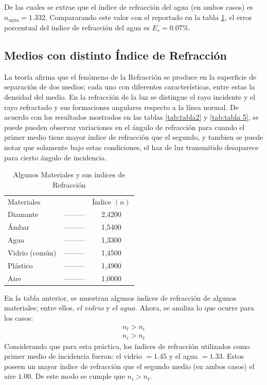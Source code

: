 \documentclass[
aps,
reprint,
amsmath, amssymb,
superscriptaddress,
]{revtex4-2}
\begin{document}
De las cuales se extrae que el índice de refracción del agua (en ambos casos) es $n_{\text{agua}}= 1.332$. Compararando este valor con el reportado en la tabla \ref{tab:indices}, el error porcentual del índice de refracción del agua es $E_r=0.07\%$.

\subsection{Medios con distinto Índice de Refracción}

La teoría afirma que el fenómeno de la Refracción se produce en la superficie de separación de dos medios; cada uno con diferentes características, entre estas la densidad del medio. En la refracción de la luz se distingue el rayo incidente y el rayo refractado y sus formaciones angulares respecto a la línea normal. De acuerdo con los resultados mostrados en las tablas \ref{tab:tabla2} y \ref{tab:tabla 5}, se puede pueden observar variaciones en el ángulo de refracción para cuando el primer medio tiene mayor índice de refracción que el segundo, y tambien se puede notar que solamente bajo estas condiciones, el haz de luz transmitido desaparece para cierto ángulo de incidencia.

\begin{table}[H]
	\caption{\label{tab:indices} Algunos Materiales y sus índices de Refracción}
	\begin{ruledtabular}
		\begin{tabular}{lcc}
            \textrm{Materiales} & \textrm{} & \textrm{Índice $(n)$}\\
			\colrule
			Diamante            & --------- & 2,4200\\
            Ámbar               & --------- & 1,5400\\
            Agua                & --------- & 1,3300\\
            Vidrio (común)      & --------- & 1,4500\\
            Plástico            & --------- & 1,4900\\
            Aire                & --------- & 1,0000\\
	\end{tabular}
	\end{ruledtabular}
\end{table}

En la tabla anterior, se muestran algunos índices de refracción de algunos materiales; entre ellos, $\textit{el vidrio}$ y $\textit{el agua}$. Ahora, se analiza lo que ocurre para los casos:
\begin{align*}
    n_{t} > n_{i}\\
    n_{i} > n_{t}
\end{align*}
Considerando que para esta práctica, los índices de refracción utilizados como primer medio de incidencia fueron: el vidrio $= 1.45$ y el agua $= 1.33$. Estos poseen un mayor índice de refracción que el segundo medio (en ambos casos) el aire $1.00$. De este modo se cumple que $n_{i} > n_{t}$. \\
\end{document}
